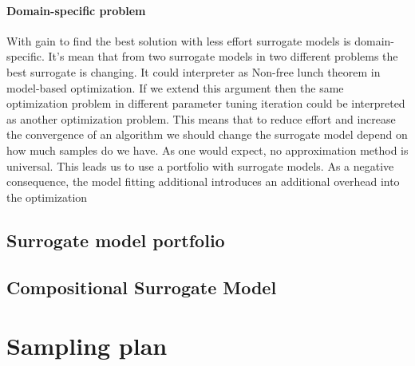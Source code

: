         \paragraph{Domain-specific problem} With gain to find the best solution with less effort surrogate models is domain-specific. It's mean that from two surrogate models in two different problems the best surrogate is changing. It could interpreter as Non-free lunch theorem in model-based optimization. If we extend this argument then the same optimization problem in different parameter tuning iteration could be interpreted as another optimization problem. This means that to reduce effort and increase the convergence of an algorithm we should change the surrogate model depend on how much samples do we have. As one would expect, no approximation method is universal. This leads us to use a portfolio with surrogate models. As a negative consequence, the model fitting additional introduces an additional overhead into the optimization
        
        \subsection{Surrogate model portfolio}


        \subsection{Compositional Surrogate Model}



    \section{Sampling plan}


